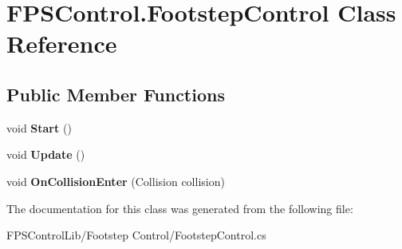 \hypertarget{class_f_p_s_control_1_1_footstep_control}{\section{F\-P\-S\-Control.\-Footstep\-Control Class Reference}
\label{class_f_p_s_control_1_1_footstep_control}
}
\subsection*{Public Member Functions}
\begin{DoxyCompactItemize}
\item 
\hypertarget{class_f_p_s_control_1_1_footstep_control_a72c8281ed6a4f782e7bbb9c9171fe0fa}{void {\bfseries Start} ()}\label{class_f_p_s_control_1_1_footstep_control_a72c8281ed6a4f782e7bbb9c9171fe0fa}

\item 
\hypertarget{class_f_p_s_control_1_1_footstep_control_a265c02dd615803ebef89a92cff1d7c2d}{void {\bfseries Update} ()}\label{class_f_p_s_control_1_1_footstep_control_a265c02dd615803ebef89a92cff1d7c2d}

\item 
\hypertarget{class_f_p_s_control_1_1_footstep_control_ab44c66635ad307d9c3ebbca6290f9ec9}{void {\bfseries On\-Collision\-Enter} (Collision collision)}\label{class_f_p_s_control_1_1_footstep_control_ab44c66635ad307d9c3ebbca6290f9ec9}

\end{DoxyCompactItemize}


The documentation for this class was generated from the following file\-:\begin{DoxyCompactItemize}
\item 
F\-P\-S\-Control\-Lib/\-Footstep Control/Footstep\-Control.\-cs\end{DoxyCompactItemize}
